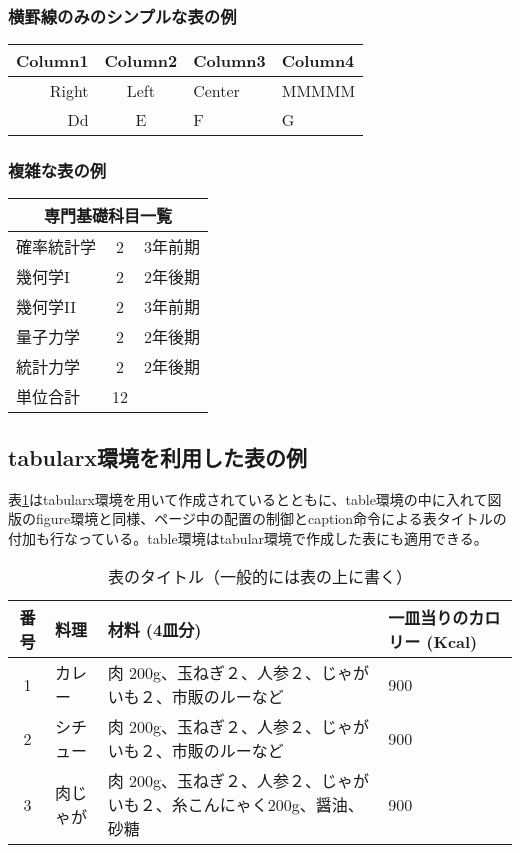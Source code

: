 \documentclass[platex,a4paper,12pt,dvipdfmx]{jsarticle}
\begin{document}
\subsubsection{横罫線のみのシンプルな表の例}

\begin{tabular}{rclp{5em}}
  \hline
  Column1    & Column2 & Column3 & Column4\\
  \hline
   Right    & Left & Center &  MMMMM\\
  Dd     & E & F & G\\
  \hline
\end{tabular}


\subsubsection{複雑な表の例}
\begin{tabular}[t]{|l|c|c|} %
  \hline
 \multicolumn{3}{|c|}{専門基礎科目一覧} \\
  \hline
  確率統計学    & 2 & 3年前期 \\ %
  幾何学I       & 2 & 2年後期 \\
  幾何学II      & 2 & 3年前期 \\
  量子力学      & 2 & 2年後期 \\
  統計力学      & 2 & 2年後期 \\
  \hline
  単位合計      & 12 \\
  \cline{1-2}
\end{tabular}

\subsection{tabularx環境を利用した表の例}
表\ref{tableexample}はtabularx環境を用いて作成されているとともに、table環境の中に入れて図版のfigure環境と同様、ページ中の配置の制御とcaption命令による表タイトルの付加も行なっている。table環境はtabular環境で作成した表にも適用できる。

\begin{table}[htb]
  \caption{表のタイトル（一般的には表の上に書く）}
  \begin{tabularx}{33zw}{| c || X |  X | X |} %
    \hline
    番号 &  料理 & 材料 (4皿分) & 一皿当りのカロリー (Kcal)\\
    \hline
    \hline
    1 &  カレー & 肉 200g、玉ねぎ２、人参２、じゃがいも２、市販のルーなど & 900 \\
    \hline
    2 &  シチュー& 肉 200g、玉ねぎ２、人参２、じゃがいも２、市販のルーなど & 900 \\
    \hline
    3 &  肉じゃが & 肉 200g、玉ねぎ２、人参２、じゃがいも２、糸こんにゃく200g、醤油、砂糖 & 900 \\
    \hline
  \end{tabularx}
  \label{tableexample}
\end{table}
\end{document}
